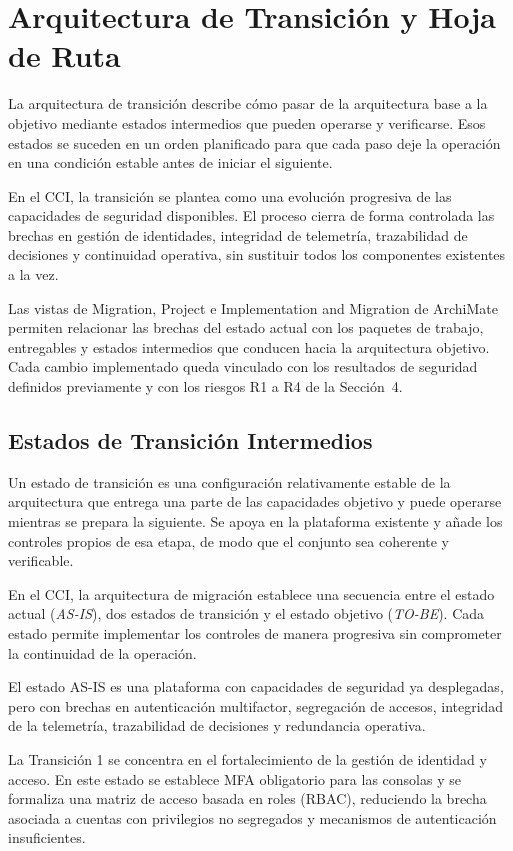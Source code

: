 \section{Arquitectura de Transición y Hoja de Ruta}

La arquitectura de transición describe cómo pasar de la arquitectura base a la objetivo mediante estados intermedios que pueden operarse y verificarse. Esos estados se suceden en un orden planificado para que cada paso deje la operación en una condición estable antes de iniciar el siguiente.

En el CCI, la transición se plantea como una evolución progresiva de las capacidades de seguridad disponibles. El proceso cierra de forma controlada las brechas en gestión de identidades, integridad de telemetría, trazabilidad de decisiones y continuidad operativa, sin sustituir todos los componentes existentes a la vez.

Las vistas de Migration, Project e Implementation and Migration de ArchiMate \parencite{archimate2022}
permiten relacionar las brechas del estado actual con los paquetes de trabajo, entregables y
estados intermedios que conducen hacia la arquitectura objetivo. Cada cambio implementado
queda vinculado con los resultados de seguridad definidos previamente y con los riesgos
R1 a R4 de la Sección~4.


\subsection{Estados de Transición Intermedios}

Un estado de transición es una configuración relativamente estable de la arquitectura que entrega una parte de las capacidades objetivo y puede operarse mientras se prepara la siguiente. Se apoya en la plataforma existente y añade los controles propios de esa etapa, de modo que el conjunto sea coherente y verificable.

En el CCI, la arquitectura de migración establece una secuencia entre el estado actual (\textit{AS-IS}), dos estados de transición y el estado objetivo (\textit{TO-BE}). Cada estado permite implementar los controles de manera progresiva sin comprometer la continuidad de la operación.

El estado AS-IS es una plataforma con capacidades de
seguridad ya desplegadas, pero con brechas en autenticación multifactor, segregación de
accesos, integridad de la telemetría, trazabilidad de decisiones y redundancia operativa.

La Transición 1 se concentra en el fortalecimiento de la gestión de identidad y acceso.
En este estado se establece MFA obligatorio para las consolas y se formaliza una matriz de
acceso basada en roles (RBAC), reduciendo la brecha asociada a cuentas con privilegios no
segregados y mecanismos de autenticación insuficientes.

